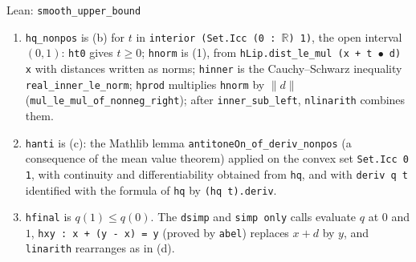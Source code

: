\documentclass[11pt,a4paper]{article}
\begin{document}
\begin{leanbox}{Lean: \texttt{smooth\_\allowbreak{}upper\_\allowbreak{}bound}}
\begin{enumerate}
\item \texttt{hq\_\allowbreak{}nonpos} is (b) for \(t\) in \texttt{interior (Set.\allowbreak{}Icc (0 : \ensuremath{\mathbb R}) 1)}, the open interval \((0,1)\): \texttt{ht0} gives \(t\ge0\); \texttt{hnorm} is (1), from \texttt{h\allowbreak{}Lip.\allowbreak{}dist\_\allowbreak{}le\_\allowbreak{}mul (x + t \ensuremath{\bullet} d) x} with distances written as norms; \texttt{hinner} is the Cauchy–Schwarz inequality \texttt{real\_\allowbreak{}inner\_\allowbreak{}le\_\allowbreak{}norm}; \texttt{hprod} multiplies \texttt{hnorm} by \(\|d\|\) (\texttt{mul\_\allowbreak{}le\_\allowbreak{}mul\_\allowbreak{}of\_\allowbreak{}nonneg\_\allowbreak{}right}); after \texttt{inner\_\allowbreak{}sub\_\allowbreak{}left}, \texttt{nlinarith} combines them.

\item \texttt{hanti} is (c): the Mathlib lemma \texttt{antitone\allowbreak{}On\_\allowbreak{}of\_\allowbreak{}deriv\_\allowbreak{}nonpos} (a consequence of the mean value theorem) applied on the convex set \texttt{Set.\allowbreak{}Icc 0 1}, with continuity and differentiability obtained from \texttt{hq}, and with \texttt{deriv q t} identified with the formula of \texttt{hq} by \texttt{(hq t).\allowbreak{}deriv}.

\item \texttt{hfinal} is \(q(1)\le q(0)\). The \texttt{dsimp} and \texttt{simp only} calls evaluate \(q\) at \(0\) and \(1\), \texttt{hxy : x + (y -\allowbreak{} x) = y} (proved by \texttt{abel}) replaces \(x+d\) by \(y\), and \texttt{linarith} rearranges as in (d).

\end{enumerate}
\end{leanbox}
\end{document}
